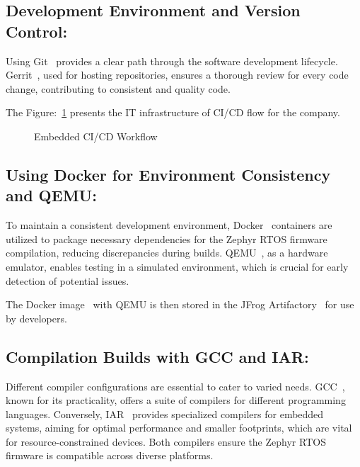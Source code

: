 \subsection*{Development Environment and Version Control:} Using
Git~\cite{loeliger2012version} provides a clear path through the software
development lifecycle. Gerrit~\cite{milanesio2013learning}, used for hosting
repositories, ensures a thorough review for every code change, contributing to
consistent and quality code.

The Figure:~\ref{fig:CI_Infrastrcuture_2} presents the IT infrastructure of CI/CD
flow for the company.

\begin{figure}[H] \centering
{}
{}
\caption{Embedded CI/CD Workflow}\label{fig:CI_Infrastrcuture_2} \end{figure}

\subsection*{Using Docker for Environment Consistency and QEMU:} To maintain a
consistent development environment, Docker~\cite{anderson2015docker} containers
are utilized to package necessary dependencies for the Zephyr RTOS firmware
compilation, reducing discrepancies during builds. QEMU~\cite{bellard2005qemu},
as a hardware emulator, enables testing in a simulated environment, which is
crucial for early detection of potential issues.

The Docker image~\cite{bui2015analysis} with QEMU is then stored in the JFrog
Artifactory~\cite{Artifact8:online} for use by developers.

\subsection*{Compilation Builds with GCC and IAR:} Different compiler
configurations are essential to cater to varied needs.
GCC~\cite{GCCtheGN9:online}, known for its practicality, offers a suite of compilers for different
programming languages. Conversely, IAR~\cite{AboutIAR98:online} provides
specialized compilers for embedded systems, aiming for optimal performance and
smaller footprints, which are vital for resource-constrained devices. Both
compilers ensure the Zephyr RTOS firmware is compatible across diverse platforms.

